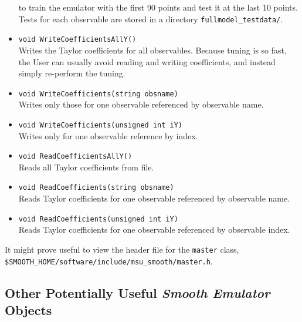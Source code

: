 \documentclass[UserManual.tex]{subfiles}
\begin{document}
\begin{sloppypar}
\begin{itemize}
\vspace*{-8pt}{\tt \begin{Verbatim}[commandchars=\\\{\}]
SmoothEmulator_TrainingPts 0-89
SmoothEmulator_TestingPts 90-99
\end{Verbatim}
}\vspace*{-8pt}
to train the emulator with the first 90 points and test it at the last 10 points. Tests for each observable are stored in a directory {\tt fullmodel\_testdata/}.

\item {\tt void WriteCoefficientsAllY()}\\
Writes the Taylor coefficients for all observables. Because tuning is so fast, the User can usually avoid reading and writing coefficients, and instead simply re-perform the tuning. 
\item {\tt void WriteCoefficients(string obsname)}\\
Writes only those for one observable referenced by observable name.
\item {\tt void WriteCoefficients(unsigned int iY)}\\
Writes only for one observable reference by index.
\item {\tt void ReadCoefficientsAllY()}\\
Reads all Taylor coefficients from file.
\item {\tt void ReadCoefficients(string obsname)}\\
Reads Taylor coefficients for one observable referenced by observable name.
\item {\tt void ReadCoefficients(unsigned int iY)}\\
Reads Taylor coefficients for one observable referenced by observable index.
\end{itemize}
It might prove useful to view the header file for the {\tt master} class, {\tt \${SMOOTH\_HOME}/software/include/msu\_smooth/master.h}.

\subsection{Other Potentially Useful {\it Smooth Emulator} Objects}


\end{sloppypar}
\end{document}
